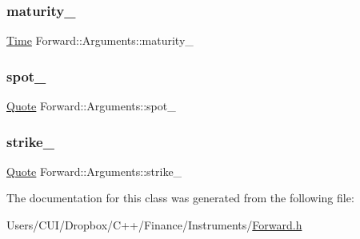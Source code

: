 \subsubsection{\texorpdfstring{maturity\+\_\+}{maturity\_}}
{\footnotesize\ttfamily \hyperlink{_name_def_8h_ac2d3e0ba793497bcca555c7c2cf64ff3}{Time} Forward\+::\+Arguments\+::maturity\+\_\+}

\hypertarget{class_forward_1_1_arguments_a407ca35969703b95866bc0c68d49d631}{}\label{class_forward_1_1_arguments_a407ca35969703b95866bc0c68d49d631} 
\subsubsection{\texorpdfstring{spot\+\_\+}{spot\_}}
{\footnotesize\ttfamily \hyperlink{_name_def_8h_a642a6c5fd87319d922637de0e0bb0305}{Quote} Forward\+::\+Arguments\+::spot\+\_\+}

\hypertarget{class_forward_1_1_arguments_acc295ee300d99631259b82448bc1184c}{}\label{class_forward_1_1_arguments_acc295ee300d99631259b82448bc1184c} 
\subsubsection{\texorpdfstring{strike\+\_\+}{strike\_}}
{\footnotesize\ttfamily \hyperlink{_name_def_8h_a642a6c5fd87319d922637de0e0bb0305}{Quote} Forward\+::\+Arguments\+::strike\+\_\+}



The documentation for this class was generated from the following file\+:\begin{DoxyCompactItemize}
\item 
Users/\+C\+U\+I/\+Dropbox/\+C++/\+Finance/\+Instruments/\hyperlink{_forward_8h}{Forward.\+h}\end{DoxyCompactItemize}
